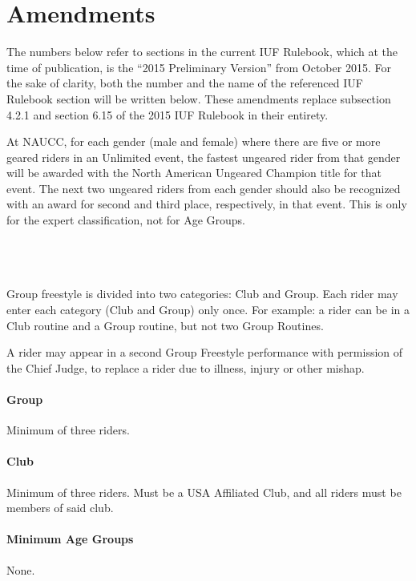 \part{Amendments}
\parttoc
{}

The numbers below refer to sections in the current IUF Rulebook, which at the time of publication, is the ``2015 Preliminary Version'' from October 2015. For the sake of clarity, both the number and the name of the referenced IUF Rulebook section will be written below. These amendments replace subsection 4.2.1 and section 6.15 of the 2015 IUF Rulebook in their entirety.

At NAUCC, for each gender (male and female) where there are five or more geared riders in an Unlimited event, the fastest ungeared rider from that gender will be awarded with the North American Ungeared Champion title for that event.
The next two ungeared riders from each gender should also be recognized with an award for second and third place, respectively, in that event.
This is only for the expert classification, not for Age Groups.

\\
\\
\\

Group freestyle is divided into two categories: Club and Group.
Each rider may enter each category (Club and Group) only once.
For example: a rider can be in a Club routine and a Group routine, but not two Group Routines.

A rider may appear in a second Group Freestyle performance with permission of the Chief Judge, to replace a rider due to illness, injury or other mishap.

\subsection{Group}
Minimum of three riders.

\subsection{Club}
Minimum of three riders. Must be a USA Affiliated Club, and all riders must be members of said club.

\subsection{Minimum Age Groups}
None.

